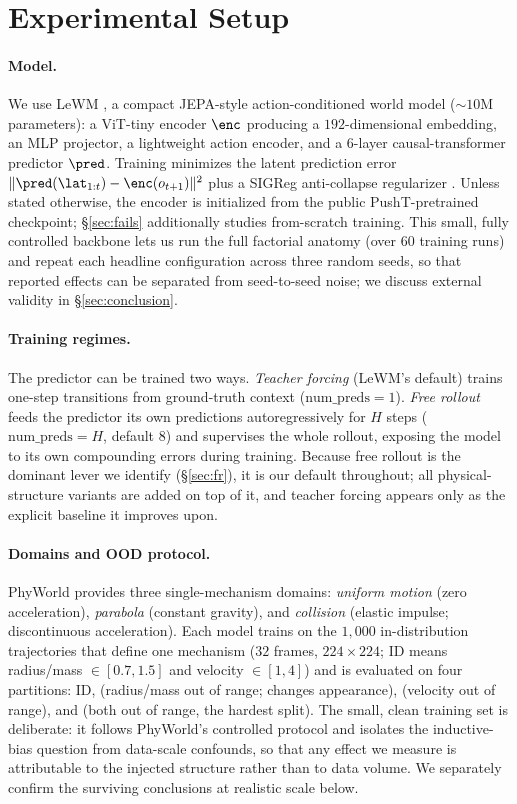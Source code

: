 \section{Experimental Setup}
\label{sec:setup}

\paragraph{Model.}
We use LeWM \citep{maes2025lewm}, a compact JEPA-style action-conditioned world model (${\sim}10$M parameters): a ViT-tiny encoder $\enc$ producing a $192$-dimensional embedding, an MLP projector, a lightweight action encoder, and a $6$-layer causal-transformer predictor $\pred$. Training minimizes the latent prediction error $\|\pred(\lat_{1:t}) - \enc(o_{t+1})\|^2$ plus a SIGReg anti-collapse regularizer \citep{balestriero2025lejepa}. Unless stated otherwise, the encoder is initialized from the public PushT-pretrained checkpoint; \S\ref{sec:fails} additionally studies from-scratch training. This small, fully controlled backbone lets us run the full factorial anatomy (over $60$ training runs) and repeat each headline configuration across three random seeds, so that reported effects can be separated from seed-to-seed noise; we discuss external validity in \S\ref{sec:conclusion}.

\paragraph{Training regimes.}
The predictor can be trained two ways. \emph{Teacher forcing} (LeWM's default) trains one-step transitions from ground-truth context ($\mathrm{num\_preds}{=}1$). \emph{Free rollout} feeds the predictor its own predictions autoregressively for $H$ steps ($\mathrm{num\_preds}{=}H$, default $8$) and supervises the whole rollout, exposing the model to its own compounding errors during training. Because free rollout is the dominant lever we identify (\S\ref{sec:fr}), it is our default throughout; all physical-structure variants are added on top of it, and teacher forcing appears only as the explicit baseline it improves upon.

\paragraph{Domains and OOD protocol.}
PhyWorld \citep{kang2024how} provides three single-mechanism domains: \emph{uniform motion} (zero acceleration), \emph{parabola} (constant gravity), and \emph{collision} (elastic impulse; discontinuous acceleration). Each model trains on the $1{,}000$ in-distribution trajectories that define one mechanism ($32$ frames, $224{\times}224$; ID means radius/mass $\in[0.7,1.5]$ and velocity $\in[1,4]$) and is evaluated on four partitions: ID, \rmood{} (radius/mass out of range; changes appearance), \vood{} (velocity out of range), and \bothood{} (both out of range, the hardest split). The small, clean training set is deliberate: it follows PhyWorld's controlled protocol and isolates the inductive-bias question from data-scale confounds, so that any effect we measure is attributable to the injected structure rather than to data volume. We separately confirm the surviving conclusions at realistic scale below.

